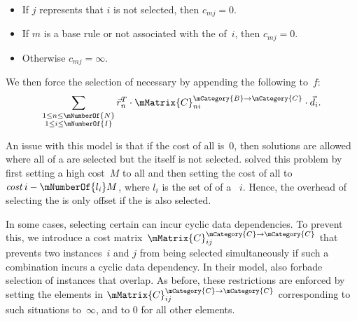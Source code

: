 \vspace{\baselineskip}

\begin{itemize}
  \item If $j$ represents that $i$ is not selected, then \mbox{$c_{mj} = 0$}.
  \item If $m$ is a \gls{base rule} or \tproxyRule not associated with the
    \tcomplexRule of~$i$, then \mbox{$c_{mj} = 0$}.
  \item Otherwise \mbox{$c_{mj} = \infty$}.
\end{itemize}
We then force the selection of necessary \tproxyRules by appending the following
to~$f$:
\begin{displaymath}
  \sum_{\substack{1 \leq n \leq \mNumberOf{N}\\1 \leq i \leq \mNumberOf{I}}}
    \mVector{r}_n^T \cdot
    \mMatrix{C}_{ni}^{\mCategory{B} \rightarrow \mCategory{C}} \cdot \mVector{d}_i.
\end{displaymath}

An issue with this model is that if the cost of all \tproxyRules is~0, then
solutions are allowed where all \tproxyRules of a \tcomplexRule are selected but
the \tcomplexRule itself is not selected.
%
\citeauthor{Ebner2008} solved this
problem by first setting a high cost~$M$ to all \tproxyRules and then setting
the cost of all \tcomplexRules to \mbox{$\mCost{i} - \mNumberOf{l_i}M$}, where
$l_i$ is the set of \tproxyRules of a \tcomplexRule~$i$.
%
Hence, the overhead of
selecting the \tproxyRules is only offset if the \tcomplexRule is also selected.

In some cases, selecting certain \tcomplexRules can incur cyclic data
dependencies.
%
To prevent this, we introduce a cost
matrix~$\mMatrix{C}_{ij}^{\mCategory{C} \rightarrow \mCategory{C}}$ that
prevents two instances~$i$ and $j$ from being selected simultaneously if such a
combination incurs a cyclic data dependency.
%
In their model,
\citeauthor{Ebner2008} also forbade selection of \tcomplexRule instances that
overlap.
%
As before, these restrictions are enforced by setting the elements in
$\mMatrix{C}_{ij}^{\mCategory{C} \rightarrow \mCategory{C}}$ corresponding to
such situations to~$\infty$, and to 0 for all other elements.

